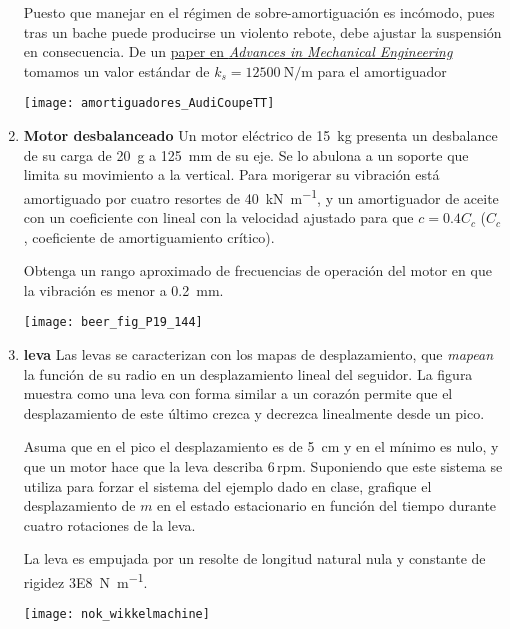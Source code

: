 \documentclass[11pt, spanish, a4paper, twopage]{article}
\begin{document}
\begin{enumerate}
\begin{minipage}[t][6cm]{0.65\textwidth}
	Puesto que manejar en el régimen de sobre-amortiguación es incómodo, pues tras un bache puede producirse un violento rebote, debe ajustar la suspensión en consecuencia.
	De un \href{https://journals.sagepub.com/doi/pdf/10.1177/1687814016648638}{paper en \emph{Advances in Mechanical Engineering}} tomamos un valor estándar de $k_s = \SI{12500}{\newton\per\metre}$ para el amortiguador
\end{minipage}
\begin{minipage}[c][0cm][t]{0.3\textwidth}
	\texttt{[image: amortiguadores\_AudiCoupeTT]}
\end{minipage}



\item 
	\begin{minipage}[t][3.5cm]{0.75\textwidth}
	\textbf{Motor desbalanceado}
	Un motor eléctrico de \SI{15}{\kilo\gram} presenta un desbalance de su carga de \SI{20}{\gram} a \SI{125}{\milli\metre} de su eje.
	Se lo abulona a un soporte que limita su movimiento a la vertical.
	Para morigerar su vibración está amortiguado por cuatro resortes de \SI{40}{\kilo\newton\per\metre}, y un amortiguador de aceite con un coeficiente con lineal con la velocidad ajustado para que $c = 0.4 C_c$ ($C_c$, coeficiente de amortiguamiento crítico).

	Obtenga un rango aproximado de frecuencias de operación del motor en que la vibración es menor a \SI{0.2}{\milli\metre}.
\end{minipage}
\begin{minipage}[c][2cm][t]{0.2\textwidth}
	\texttt{[image: beer\_fig\_P19\_144]}
\end{minipage}



\item
	\begin{minipage}[t][3.5cm]{0.75\textwidth}
	\textbf{leva}
	Las levas se caracterizan con los mapas de desplazamiento, que \emph{mapean} la función de su radio en un desplazamiento lineal del seguidor.
	La figura muestra como una leva con forma similar a un corazón permite que el desplazamiento de este último crezca y decrezca linealmente desde un pico.
				
	Asuma que en el pico el desplazamiento es de \SI{5}{\centi\metre} y en el mínimo es nulo, y que un motor hace que la leva describa $6\,\mathrm{rpm}$.  
	Suponiendo que este sistema se utiliza para forzar el sistema del ejemplo dado en clase, grafique el desplazamiento de $m$ en el estado estacionario en función del tiempo durante cuatro rotaciones de la leva.

	La leva es empujada por un resolte de longitud natural nula y constante de rigidez \SI{3E8}{\newton\per\metre}.
\end{minipage}
\begin{minipage}[c][2cm][t]{0.2\textwidth}
	\texttt{[image: nok\_wikkelmachine]}
\end{minipage}




\end{enumerate}
\end{document}
